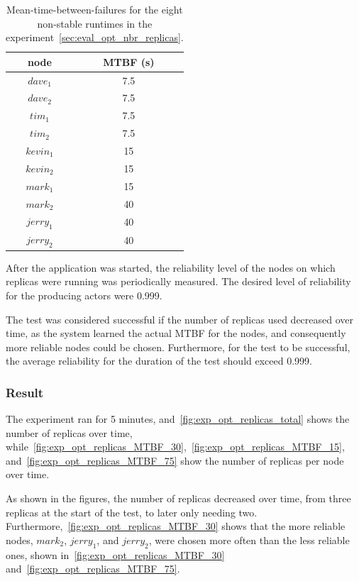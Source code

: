 \documentclass{cslthse-msc}
\begin{document}
\begin{table}[h]
	\begin{center}
	\begin{tabular}{| c | c |}
	 \hline
	 node & MTBF (s) \\
	 \hline		
	  $dave_1$ & 7.5 \\
	  $dave_2$ & 7.5 \\
	  $tim_1$ & 7.5 \\
	  $tim_2$ & 7.5 \\
	  $kevin_1$ & 15 \\
	  $kevin_2$ & 15 \\
	  $mark_1$ & 15 \\
	  $mark_2$ & 40 \\
	  $jerry_1$ & 40 \\
	  $jerry_2$ & 40 \\
	   \hline
	\end{tabular}
	 \caption{Mean-time-between-failures for the eight non-stable runtimes in the experiment~\ref{sec:eval_opt_nbr_replicas}.}
	 \label{table:exp_nodes_means}
	 \end{center}
 \end{table}


After the application was started, the reliability level of the nodes on which replicas were running was periodically measured. The desired level of reliability for the producing actors were 0.999.

The test was considered successful if the number of replicas used decreased over time, as the system learned the actual MTBF for the nodes, and consequently more reliable nodes could be chosen. Furthermore, for the test to be successful, the average reliability for the duration of the test should exceed 0.999.

\subsubsection*{Result}
The experiment ran for 5 minutes, and~\cref{fig:exp_opt_replicas_total} shows the number of replicas over time, while~\cref{fig:exp_opt_replicas_MTBF_30},~\cref{fig:exp_opt_replicas_MTBF_15}, and~\cref{fig:exp_opt_replicas_MTBF_75} show the number of replicas per node over time.

As shown in the figures, the number of replicas decreased over time, from three replicas at the start of the test, to later only needing two. Furthermore,~\cref{fig:exp_opt_replicas_MTBF_30} shows that the more reliable nodes, $mark_2$, $jerry_1$, and $jerry_2$, were chosen more often than the less reliable ones, shown in~\cref{fig:exp_opt_replicas_MTBF_30} and~\cref{fig:exp_opt_replicas_MTBF_75}.
\end{document}
